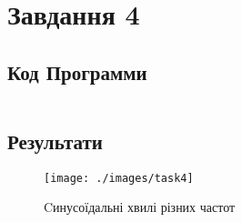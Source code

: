 \section{Завдання 4}
\label{sec:task4}

\subsection{Код Программи}
\label{subsec:task4_code}
\inputminted{python}{../src/task4.py}

\subsection{Результати}
\label{subsec:task4_results}

\begin{figure}[!ht]
    \centering
    \texttt{[image: ./images/task4]}
    \caption{Cинусоїдальні хвилі різних частот}
    \label{fig:sine_waves}
\end{figure}
